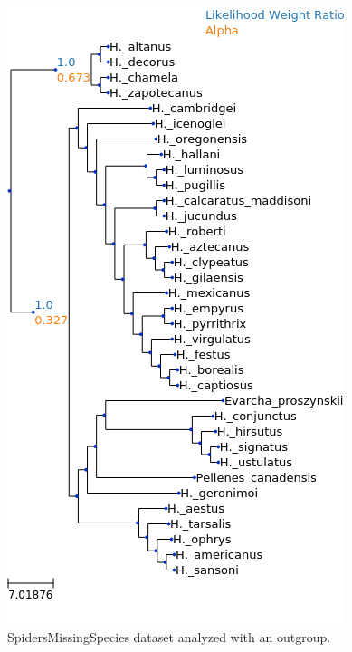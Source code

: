 \documentclass{article}
\begin{document}
\begin{figure}
  \begin{center}
    \includegraphics[width=.75\linewidth]{figs/spiders/missing_species_outgroup_lwr.png}
    \caption{SpidersMissingSpecies dataset analyzed with an outgroup.}
    \label{fig:spiders-missing-species-outgroup}
  \end{center}
\end{figure}
\end{document}
